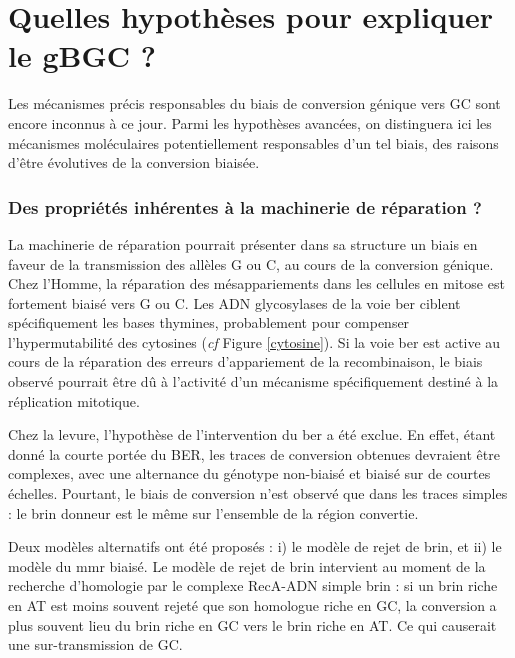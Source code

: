 \documentclass[11pt, oneside]{scrartcl}
\begin{document}
\section{Quelles hypothèses pour expliquer le gBGC ?}
\label{sec:orgheadline11}
Les mécanismes précis responsables du biais de conversion génique vers GC sont
encore inconnus à ce jour. Parmi les hypothèses avancées, on distinguera ici les
mécanismes moléculaires potentiellement responsables d'un tel biais, des raisons
d'être évolutives de la conversion biaisée.

\subsubsection*{Des propriétés inhérentes à la machinerie de réparation ?}
\label{sec:orgheadline9}

La machinerie de réparation pourrait présenter dans sa structure un biais en
faveur de la transmission des allèles G ou C, au cours de la conversion génique.
Chez l'Homme, la réparation des mésappariements dans les cellules en mitose est
fortement biaisé vers G ou C. Les ADN glycosylases de la voie \ac{ber} ciblent
spécifiquement les bases thymines, probablement pour compenser l'hypermutabilité
des cytosines\cite{brown_specific_1987} (\emph{cf} Figure \ref{cytosine}). Si la voie
\ac{ber} est active au cours de la réparation des erreurs d'appariement de la
recombinaison, le biais observé pourrait être dû à l'activité d'un mécanisme
spécifiquement destiné à la réplication mitotique.

Chez la levure, l'hypothèse de l'intervention du \ac{ber} a été
exclue\cite{lesecque_gc-biased_2013}. En effet, étant donné la courte portée du
BER, les traces de conversion obtenues devraient être complexes, avec une
alternance du génotype non-biaisé et biaisé sur de courtes échelles. Pourtant,
le biais de conversion n'est observé que dans les traces simples : le brin
donneur est le même sur l'ensemble de la région convertie.

Deux modèles alternatifs ont été proposés\cite{lesecque_gc-biased_2013} : i) le
modèle de rejet de brin, et ii) le modèle du \ac{mmr} biaisé. Le modèle de rejet
de brin intervient au moment de la recherche d'homologie par le complexe
RecA-ADN simple brin : si un brin riche en AT est moins souvent rejeté que son
homologue riche en GC, la conversion a plus souvent lieu du brin riche en GC
vers le brin riche en AT. Ce qui causerait une sur-transmission de GC. 
\end{document}
